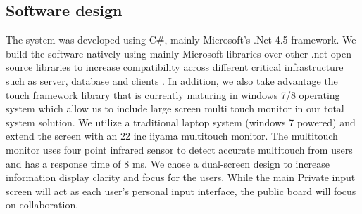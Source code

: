 \documentclass{sigchi}
\begin{document}
\subsection{Software design}


The system was developed using C\#, mainly Microsoft's .Net 4.5  framework. We build the software natively using mainly Microsoft libraries over other .net open source libraries to increase compatibility across different critical infrastructure such as server, database and clients . In addition, we also take advantage the touch framework library that is currently maturing in windows 7/8 operating system which allow us to include large screen  multi touch monitor in our  total system solution. We utilize a traditional laptop system (windows 7 powered) and extend the screen with an 22 inc iiyama multitouch monitor. The multitouch monitor uses four point infrared sensor to detect accurate multitouch from users and has a response time of 8 ms.
We chose a dual-screen design to increase information display clarity and focus for the users. While the main Private input screen will act as each user's personal input interface,  the public board will focus on collaboration. 
\end{document}
